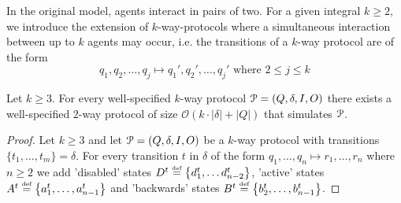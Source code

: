 In the original model, agents interact in pairs of two. 
For a given integral $k\geq 2$, we introduce the extension of 
$k$-way-protocols where a simultaneous interaction between up to $k$ agents 
may occur, i.e. the transitions of a $k$-way protocol are of the form
$$q_1, q_2, \ldots, q_j \mapsto q_1', q_2', \ldots, q_j' 
  \text{ where } 2 \leq j \leq k$$
\begin{lemma}
	Let $k \geq 3$.
	For every well-specified $k$-way protocol $\mathcal{P}= (Q, \delta, I, O)$ 
	there exists a well-specified $2$-way protocol of size 
	$\mathcal{O}(k \cdot |\delta| + |Q|)$ that simulates $\mathcal{P}$.
\end{lemma}
\begin{proof}
	Let $k \geq 3$ and let $\mathcal{P} = (Q, \delta, I, O)$ be a $k$-way protocol with 
	transitions $\{t_1, \ldots, t_m\} = \delta$. 
	For every transition $t$ in $\delta$ of the form 
	$q_1, \ldots, q_n \mapsto r_1, \ldots, r_n$ where $n \geq 2$ 
	we add 'disabled' states $D^t \stackrel{\scriptscriptstyle\text{def}}{=} \left\{d^t_{1}, \ldots d^t_{{n-2}}\right\}$, 
	'active' states $A^t \stackrel{\scriptscriptstyle\text{def}}{=} \left\{a^t_{1}, \ldots, a^t_{{n-1}}\right\}$ and 
	'backwards' states $B^t \stackrel{\scriptscriptstyle\text{def}}{=} \left\{b^t_{2}, \ldots, b^t_{n-1}\right\}$.


\end{proof}
